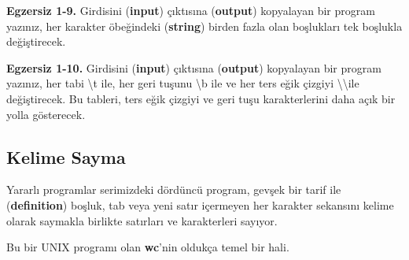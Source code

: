 \documentclass[a4paper,12pt,oneside]{book}
\begin{document}
\noindent \textbf{Egzersiz 1-9.} Girdisini (\textbf{input}) çıktısına (\textbf{output}) kopyalayan bir program yazınız, her karakter öbeğindeki (\textbf{string}) birden fazla olan boşlukları tek boşlukla değiştirecek. \newline

\noindent \textbf{Egzersiz 1-10.} Girdisini (\textbf{input}) çıktısına (\textbf{output}) kopyalayan bir program yazınız, her tabi \textbackslash t ile, her geri tuşunu \textbackslash b ile ve her ters eğik çizgiyi \textbackslash \textbackslash ile değiştirecek. Bu tableri, ters eğik çizgiyi ve geri tuşu karakterlerini daha açık bir yolla gösterecek.

\subsection{Kelime Sayma}

\par Yararlı programlar serimizdeki dördüncü program, gevşek bir tarif ile (\textbf{definition}) boşluk, tab veya yeni satır içermeyen her karakter sekansını kelime olarak saymakla birlikte satırları ve karakterleri sayıyor. \pagebreak

\noindent Bu bir UNIX programı olan \textbf{wc}'nin oldukça temel bir hali.
\end{document}
